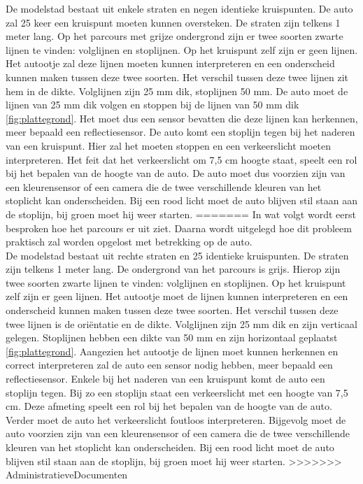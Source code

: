 \documentclass[a4paper,twoside,kulak]{kulakreport} %
\begin{document}
De modelstad bestaat uit enkele straten en negen identieke kruispunten. De auto zal 25 keer een kruispunt moeten kunnen oversteken. De straten zijn telkens 1 meter lang. Op het parcours met grijze ondergrond zijn er twee soorten zwarte lijnen te vinden: volglijnen en stoplijnen. Op het kruispunt zelf zijn er geen lijnen. Het autootje zal deze lijnen moeten kunnen interpreteren en een onderscheid kunnen maken tussen deze twee soorten. Het verschil tussen deze twee lijnen zit hem in de dikte. Volglijnen zijn 25 mm dik, stoplijnen 50 mm. De auto moet de lijnen van 25 mm dik volgen en stoppen bij de lijnen van 50 mm dik \ref{fig:plattegrond}. Het moet dus een sensor bevatten die deze lijnen kan herkennen, meer bepaald een reflectiesensor. De auto komt een stoplijn tegen bij het naderen van een kruispunt. Hier zal het moeten stoppen en een verkeerslicht moeten interpreteren. Het feit dat het verkeerslicht om 7,5 cm hoogte staat, speelt een rol bij het bepalen van de hoogte van de auto. De auto moet dus voorzien zijn van een kleurensensor of een camera die de twee verschillende kleuren van het stoplicht kan onderscheiden. Bij een rood licht moet de auto blijven stil staan aan de stoplijn, bij groen moet hij weer starten.
=======
In wat volgt wordt eerst besproken hoe het parcours er uit ziet. Daarna wordt uitgelegd hoe dit probleem praktisch zal worden opgelost met betrekking op de auto.\\
De modelstad bestaat uit rechte straten en 25 identieke kruispunten. De straten zijn telkens 1 meter lang. De ondergrond van het parcours is grijs. Hierop zijn twee soorten zwarte lijnen te vinden: volglijnen en stoplijnen. Op het kruispunt zelf zijn er geen lijnen. Het autootje moet de lijnen kunnen interpreteren en een onderscheid kunnen maken tussen deze twee soorten. Het verschil tussen deze twee lijnen is de oriëntatie en de dikte. Volglijnen zijn 25 mm dik en zijn verticaal gelegen. Stoplijnen hebben een dikte van 50 mm en zijn horizontaal geplaatst \ref{fig:plattegrond}. Aangezien het autootje de lijnen moet kunnen herkennen en correct interpreteren zal de auto een sensor nodig hebben, meer bepaald een reflectiesensor. Enkele bij het naderen van een kruispunt komt de auto een stoplijn tegen. Bij zo een stoplijn staat een verkeerslicht met een hoogte van 7,5 cm. Deze afmeting speelt een rol bij het bepalen van de hoogte van de auto. Verder moet de auto het verkeerslicht foutloos interpreteren. Bijgevolg moet de auto voorzien zijn van een kleurensensor of een camera die de twee verschillende kleuren van het stoplicht kan onderscheiden. Bij een rood licht moet de auto blijven stil staan aan de stoplijn, bij groen moet hij weer starten.
>>>>>>> AdministratieveDocumenten
\end{document}
